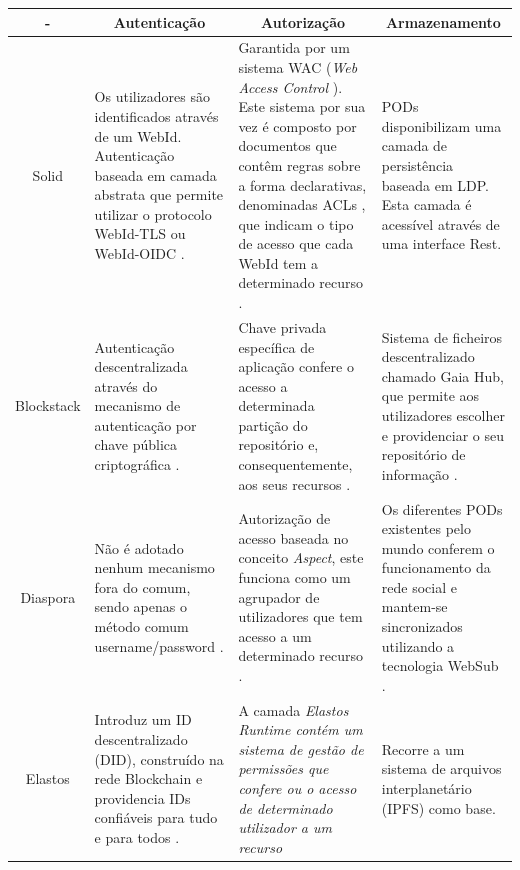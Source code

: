 \begin{center}
\small
\begin{longtable}{c|p{4cm}|p{4cm}|p{4cm}}
\toprule 
    \multicolumn{1}{c}{-} &
    \multicolumn{1}{c}{Autenticação} &
    \multicolumn{1}{c}{Autorização} &
    \multicolumn{1}{c}{Armazenamento}
    \\ \midrule\addlinespace[2pt] \endhead

\bottomrule\endfoot

Solid & Os utilizadores são identificados através de um WebId. Autenticação baseada em camada abstrata que permite utilizar o protocolo WebId-TLS ou WebId-OIDC \cite{solid_spec}. &  Garantida por um sistema WAC (\emph{Web Access Control} \label{sym:WAC}). Este sistema por sua vez é composto por documentos que contêm regras sobre a forma declarativas, denominadas ACLs \label{sym:ACL}, que indicam o tipo de acesso que cada WebId tem a determinado recurso \cite{solid_web_access_control}. & PODs disponibilizam uma camada de persistência baseada em LDP. Esta camada é acessível através de uma interface Rest. \cite{solid_spec} \\
Blockstack & Autenticação descentralizada através do mecanismo de autenticação por chave pública criptográfica \cite{blockstack_white_paper}. & Chave privada específica de aplicação confere o acesso a determinada partição do repositório e, consequentemente, aos seus recursos \cite{blockstack_white_paper}. & Sistema de ficheiros descentralizado chamado Gaia Hub, que permite aos utilizadores escolher e providenciar o seu repositório de informação \cite{blockstack_white_paper}. \\
Diaspora & Não é adotado nenhum mecanismo fora do comum, sendo apenas o método comum username/password \cite{diaspora_wiki}. & Autorização de acesso baseada no conceito \emph{Aspect}, este funciona como um agrupador de utilizadores que tem acesso a um determinado recurso \cite{diaspora_wiki}. & Os diferentes PODs existentes pelo mundo conferem o funcionamento da rede social e mantem-se sincronizados utilizando a tecnologia WebSub \cite{diaspora_wiki}. \\
Elastos & Introduz um ID descentralizado (DID), construído na rede Blockchain e providencia IDs confiáveis para tudo e para todos \cite{elastos_white_paper}. & A camada \emph{Elastos Runtime contém um sistema de gestão de permissões que confere ou o acesso de determinado utilizador a um recurso} \cite{elastos_white_paper} & Recorre a um sistema de arquivos interplanetário (IPFS) como base. \cite{elastos_developer} \\

\end{longtable}

\end{center}

